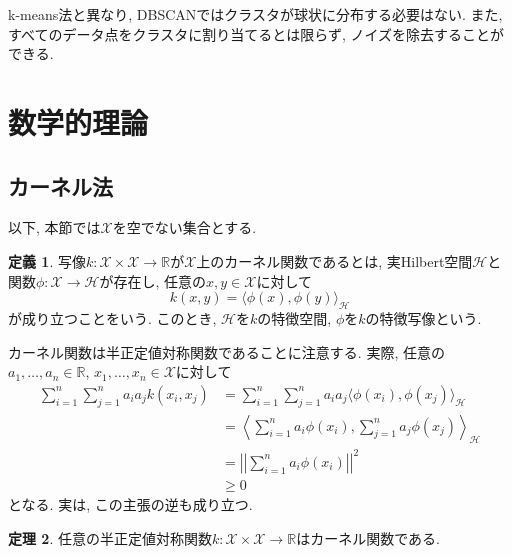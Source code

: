 \documentclass[uplatex]{jsarticle}
\theoremstyle{definition}
\newtheorem{definition}{定義}[section]
\newtheorem{theorem}[definition]{定理}
\numberwithin{equation}{section}
\newcommand{\R}{\mathbb{R}}
\newcommand{\norm}[1]{\left|\left|#1\right|\right|}
\begin{document}
k-means法と異なり, DBSCANではクラスタが球状に分布する必要はない.
また, すべてのデータ点をクラスタに割り当てるとは限らず, ノイズを除去することができる.


\section{数学的理論}
\subsection{カーネル法}
以下, 本節では$\mathcal{X}$を空でない集合とする.
\begin{definition}
    写像$k \colon \mathcal{X} \times \mathcal{X} \to \R$が$\mathcal{X}$上のカーネル関数であるとは, 実Hilbert空間$\mathcal{H}$と関数$\phi \colon \mathcal{X} \to \mathcal{H}$が存在し, 任意の$x, y \in \mathcal{X}$に対して
    \begin{equation}
        k(x, y) = \langle\phi(x), \phi(y)\rangle_{\mathcal{H}}
    \end{equation}
    が成り立つことをいう.
    このとき, $\mathcal{H}$を$k$の特徴空間, $\phi$を$k$の特徴写像という.
\end{definition}
カーネル関数は半正定値対称関数であることに注意する.
実際, 任意の$a_{1}, \dots, a_{n} \in \R$, $x_{1}, \dots, x_{n} \in \mathcal{X}$に対して
\begin{align*}
    \sum_{i = 1}^{n} \sum_{j = 1}^{n} a_{i}a_{j}k(x_{i}, x_{j})
    &= \sum_{i = 1}^{n} \sum_{j = 1}^{n} a_{i}a_{j}\langle\phi(x_{i}), \phi(x_{j})\rangle_{\mathcal{H}} \\
    &= \left\langle\sum_{i = 1}^{n} a_{i}\phi(x_{i}), \sum_{j = 1}^{n} a_{j}\phi(x_{j})\right\rangle_{\mathcal{H}} \\
    &= \norm{\sum_{i = 1}^{n} a_{i}\phi(x_{i})}^{2} \\
    &\geq 0
\end{align*}
となる.
実は, この主張の逆も成り立つ.
\begin{theorem}
    任意の半正定値対称関数$k \colon \mathcal{X} \times \mathcal{X} \to \R$はカーネル関数である.
\end{theorem}
\end{document}
